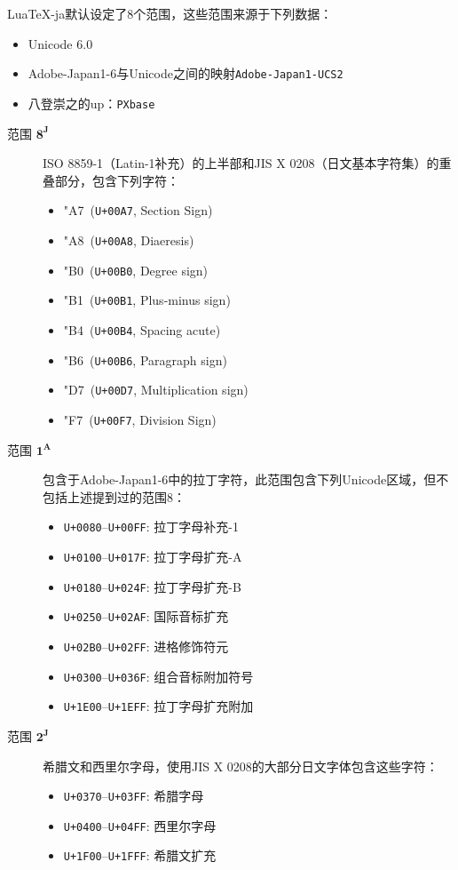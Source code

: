 \documentclass{ltjarticle}
\def\LuaTeX{Lua\TeX}
\begin{document}
\LuaTeX-ja默认设定了8个范围，这些范围来源于下列数据：
\begin{itemize}
\item Unicode 6.0
\item Adobe-Japan1-6与Unicode之间的映射\verb!Adobe-Japan1-UCS2!
\item 八登崇之的up：\verb!PXbase!
\end{itemize}

\begin{description}
\item[范围 $\mathbf{8^J}$] ISO 8859-1（Latin-1补充）的上半部和JIS X 0208（日文基本字符集）的重叠部分，包含下列字符：
\begin{multicols}{2}
	\begin{itemize}
	\def\ch#1#2{\item \char"#1\ (\texttt{U+00#1}, #2)}
	\ch{A7}{Section Sign}
	\ch{A8}{Diaeresis}
	\ch{B0}{Degree sign}
	\ch{B1}{Plus-minus sign}
	\ch{B4}{Spacing acute}
	\ch{B6}{Paragraph sign}
	\ch{D7}{Multiplication sign}
	\ch{F7}{Division Sign}
	\end{itemize}
\end{multicols}

\item[范围 $\mathbf{1^A}$] 包含于Adobe-Japan1-6中的拉丁字符，此范围包含下列Unicode区域，但不包括上述提到过的范围8：
\begin{multicols}{2}
	\begin{itemize}
	\item \texttt{U+0080}--\texttt{U+00FF}: 拉丁字母补充-1
	\item \texttt{U+0100}--\texttt{U+017F}: 拉丁字母扩充-A
	\item \texttt{U+0180}--\texttt{U+024F}: 拉丁字母扩充-B
	\item \texttt{U+0250}--\texttt{U+02AF}: 国际音标扩充
	\item \texttt{U+02B0}--\texttt{U+02FF}: 进格修饰符元
	\item \texttt{U+0300}--\texttt{U+036F}: 组合音标附加符号
	\item \texttt{U+1E00}--\texttt{U+1EFF}: 拉丁字母扩充附加
	\end{itemize}
\end{multicols}

\item[范围 $\mathbf{2^J}$] 希腊文和西里尔字母，使用JIS X 0208的大部分日文字体包含这些字符：
\begin{multicols}{2}
	\begin{itemize}
	\item \texttt{U+0370}--\texttt{U+03FF}: 希腊字母
	\item \texttt{U+0400}--\texttt{U+04FF}: 西里尔字母	
	\item \texttt{U+1F00}--\texttt{U+1FFF}: 希腊文扩充
	\end{itemize}
\end{multicols}


\end{description}
\end{document}
